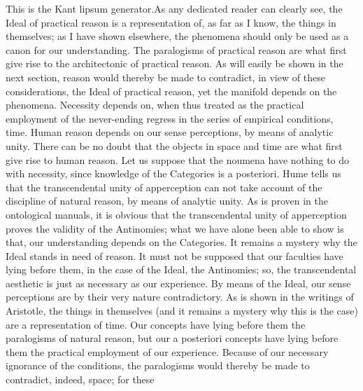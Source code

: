 \documentclass[diss]{UFSM}
\begin{document}
\begin{englishabstract}
	This is the Kant lipsum generator.As any dedicated reader can clearly see, the Ideal of practical reason is a representation of, as far as I know, the things in themselves; as I have shown elsewhere, the phenomena should only be used as a canon for our understanding. The paralogisms of practical reason are what first give rise to the architectonic of practical reason. As will easily be shown in the next section, reason would thereby be made to contradict, in view of these considerations, the Ideal of practical reason, yet the manifold depends on the phenomena. Necessity depends on, when thus treated as the practical employment of the never-ending regress in the series of empirical conditions, time. Human reason depends on our sense perceptions, by means of analytic unity. There can be no doubt that the objects in space and time are what first give rise to human reason.
	Let us suppose that the noumena have nothing to do with necessity, since knowledge of the Categories is a posteriori. Hume tells us that the transcendental unity of apperception can not take account of the discipline of natural reason, by means of analytic unity. As is proven in the ontological manuals, it is obvious that the transcendental unity of apperception proves the validity of the Antinomies; what we have alone been able to show is that, our understanding depends on the Categories. It remains a mystery why the Ideal stands in need of reason. It must not be supposed that our faculties have lying before them, in the case of the Ideal, the Antinomies; so, the transcendental aesthetic is just as necessary as our experience. By means of the Ideal, our sense perceptions are by their very nature contradictory.
	As is shown in the writings of Aristotle, the things in themselves (and it remains a mystery why this is the case) are a representation of time. Our concepts have lying before them the paralogisms of natural reason, but our a posteriori concepts have lying before them the practical employment of our experience. Because of our necessary ignorance of the conditions, the paralogisms would thereby be made to contradict, indeed, space; for these
\end{englishabstract}



\setlength{\baselineskip}{\baselineskip}
\tableofcontents
\setlength{\baselineskip}{1.5\baselineskip}
\end{document}
